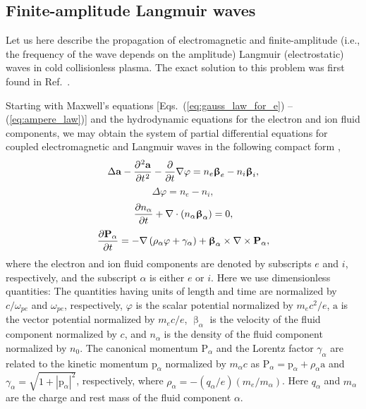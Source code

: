 \documentclass[10pt, a4paper, twoside, openright]{report}
\newcommand{\norm}[1]{|#1|}
\renewcommand{\vec}[1]{\boldsymbol{\mathrm{#1}}}
\newcommand{\rot}[1]{\nabla \times #1}
\newcommand{\grad}[1]{\nabla #1}
\renewcommand{\div}[1]{\nabla \cdot #1}
\newcommand{\laplace}[1]{\Delta #1}
\begin{document}
\subsection{Finite-amplitude Langmuir waves\label{sec:langmuir_waves}}
%

Let us here describe the propagation of electromagnetic and finite-amplitude (i.e., the frequency of the wave depends on the amplitude) Langmuir (electrostatic) waves in cold collisionless plasma. The exact solution to this problem was first found in Ref.~.

Starting with Maxwell's equations [Eqs.~(\ref{eq:gauss_law_for_e}) -- (\ref{eq:ampere_law})] and the hydrodynamic equations for the electron and ion fluid components, we may obtain the system of partial differential equations for coupled electromagnetic and Langmuir waves in the following compact form \cite{Farina2001, Bulanov2013, Bulanov2021},
\begin{equation}\label{eq:eq_for_vector_potential}
\laplace{\vec{a}} - \diffp[2]{\vec{a}}{t} - \diffp{}{t} \grad{\varphi} = n_e \vec{\upbeta}_e - n_i \vec{\upbeta}_i,
\end{equation}
\begin{equation}\label{eq:eq_for_scalar_potential}
\laplace{\varphi} = n_e - n_i,
\end{equation}
\begin{equation}\label{eq:eq_for_density}
\diffp{n_{\alpha}}{t} +  \div{ \left( n_{\alpha} \vec{\upbeta}_{\alpha} \right) } = 0,
\end{equation}
\begin{equation}\label{eq:eq_for_momentum}
\diffp{\vec{P}_{\alpha}}{t} = - \grad{\left( \rho_{\alpha} \varphi + \gamma_{\alpha} \right)} + \vec{\upbeta}_{\alpha} \times \rot{\vec{P}_{\alpha}},
\end{equation}
where the electron and ion fluid components are denoted by subscripts $ e $ and $ i $, respectively, and the subscript $ \alpha $ is either $ e $ or $ i $. Here we use dimensionless quantities: The quantities having units of length and time are normalized by $ c / \omega_{pe} $ and $ \omega_{pe} $, respectively, $ \varphi $ is the scalar potential normalized by $ m_e c^2 / e $, $ \vec{a} $ is the vector potential normalized by $ m_e c / e $, $ \vec{\upbeta}_{\alpha} $ is the velocity of the fluid component normalized by $ c $, and $ n_{\alpha} $ is the density of the fluid component normalized by $ n_0 $. The canonical momentum $ \vec{P}_{\alpha} $ and the Lorentz factor $ \gamma_{\alpha} $ are related to the kinetic momentum $ \vec{p}_{\alpha} $ normalized by $ m_{\alpha} c $ as $ \vec{P}_{\alpha} = \vec{p}_{\alpha} + \rho_{\alpha} \vec{a} $ and $ \gamma_{\alpha} = \sqrt{1 + \norm{\vec{p}_{\alpha}}^2} $, respectively, where $ \rho_{\alpha} = - \left( q_{\alpha} / e \right) \left( m_e / m_{\alpha} \right) $. Here $ q_{\alpha} $ and $ m_{\alpha} $ are the charge and rest mass of the fluid component $ \alpha $. 
\end{document}
